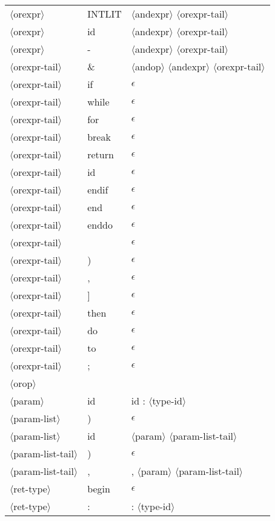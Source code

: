 \documentclass[11pt, fleqn]{article}
\newcommand{\atag}[1]{$\langle$#1$\rangle$}
\begin{document}
\begin{longtable}{l|l|l}
\atag{orexpr} 					&	INTLIT			&	\atag{andexpr} \atag{orexpr-tail}	\\
\atag{orexpr} 					&	id			&\atag{andexpr} \atag{orexpr-tail}		\\
\atag{orexpr} 					&	-			&	\atag{andexpr} \atag{orexpr-tail}	\\
\atag{orexpr-tail}				&	\& 		&	\atag{andop} \atag{andexpr} \atag{orexpr-tail}	\\
\atag{orexpr-tail}				&	 if		&	$\epsilon$	\\
\atag{orexpr-tail}				&	 while		&	$\epsilon$	\\
\atag{orexpr-tail}				&	 for		&	$\epsilon$	\\
\atag{orexpr-tail}				&	 break		&	$\epsilon$	\\
\atag{orexpr-tail}				&	 return		&	$\epsilon$	\\
\atag{orexpr-tail}				&	 id		&	$\epsilon$	\\
\atag{orexpr-tail}				&	 endif		&	$\epsilon$	\\
\atag{orexpr-tail}				&	 end		&$\epsilon$		\\
\atag{orexpr-tail}				&	 enddo	&$\epsilon$		\\
\atag{orexpr-tail}				&	 \textbar		&	$\epsilon$	\\
\atag{orexpr-tail}				&	 )		&	$\epsilon$	\\
\atag{orexpr-tail}				&	 ,		&	$\epsilon$	\\
\atag{orexpr-tail}				&	 ]		&	$\epsilon$	\\
\atag{orexpr-tail}				&	 then		&	$\epsilon$	\\
\atag{orexpr-tail}				&	 do		&	$\epsilon$	\\
\atag{orexpr-tail}				&	 to		&	$\epsilon$	\\
\atag{orexpr-tail}				&	 ;		&	$\epsilon$	\\
\atag{orop} 						&	\textbar		&	\textbar	\\
\atag{param}						&	id		&	id : \atag{type-id}		\\
\atag{param-list}				&	)		&	$\epsilon$	\\
\atag{param-list}				&	id		&	\atag{param}	 \atag{param-list-tail}	\\
\atag{param-list-tail}			&	)		&	$\epsilon$	\\
\atag{param-list-tail}			&	,		&	, \atag{param} \atag{param-list-tail}	\\
\atag{ret-type}					&	begin	&	$\epsilon$	\\
\atag{ret-type}					&	:		&	: \atag{type-id}		\\

\end{longtable}
\end{document}
